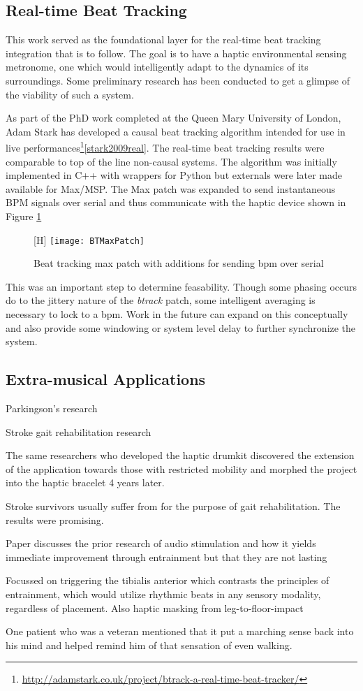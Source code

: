 \subsection{Real-time Beat Tracking}
This work served as the foundational layer for the real-time beat tracking integration that is to follow. The goal is to have a haptic environmental sensing metronome, one which would intelligently adapt to the dynamics of its surroundings. Some preliminary research has been conducted to get a glimpse of the viability of such a system.

As part of the PhD work completed at the Queen Mary University of London, Adam Stark has developed a causal beat tracking algorithm intended for use in live performances\footnote{\url{http://adamstark.co.uk/project/btrack-a-real-time-beat-tracker/}}\ref{stark2009real}. The real-time beat tracking results were comparable to top of the line non-causal systems. The algorithm was initially implemented in C++ with wrappers for Python but externals were later made available for Max/MSP.
The Max patch was expanded to send instantaneous BPM signals over serial and thus communicate with the haptic device shown in Figure \ref{BTMaxPatch}

\begin{figure}\label{BTMaxPatch}[H]
    \centering
    \texttt{[image: BTMaxPatch]}
    \caption{Beat tracking max patch with additions for sending bpm over serial}
\end{figure}

This was an important step to determine feasability. Though some phasing occurs do to the jittery nature of the \textit{btrack} patch, some intelligent averaging is necessary to lock to a bpm. Work in the future can expand on this conceptually and also provide some windowing or system level delay to further synchronize the system.

\subsection{Extra-musical Applications}

Parkingson's research

Stroke gait rehabilitation research \cite{holland2014gait}

The same researchers who developed the haptic drumkit discovered the extension of the application towards those with restricted mobility and morphed the project into the haptic bracelet 4 years later.

Stroke survivors usually suffer from for the purpose of gait rehabilitation. The results were promising. 

Paper discusses the prior research of audio stimulation and how it yields immediate improvement through entrainment but that they are not lasting

Focussed on triggering the tibialis anterior which contrasts the principles of entrainment, which would utilize rhythmic beats in any sensory modality, regardless of placement. Also haptic masking from leg-to-floor-impact

One patient who was a veteran mentioned that it put a marching sense back into his mind and helped remind him of that sensation of even walking.
